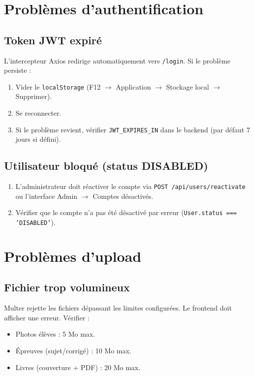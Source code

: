 \documentclass[12pt,a4paper]{report}
\begin{document}
\section{Problèmes d'authentification}

\subsection{Token JWT expiré}
L'intercepteur Axios redirige automatiquement vers \texttt{/login}. Si le problème persiste :
\begin{enumerate}
    \item Vider le \texttt{localStorage} (F12 $\rightarrow$ Application $\rightarrow$ Stockage local $\rightarrow$ Supprimer).
    \item Se reconnecter.
    \item Si le problème revient, vérifier \texttt{JWT\_EXPIRES\_IN} dans le backend (par défaut 7 jours si défini).
\end{enumerate}

\subsection{Utilisateur bloqué (status DISABLED)}
\begin{enumerate}
    \item L'administrateur doit réactiver le compte via \texttt{POST /api/users/reactivate} ou l'interface Admin $\rightarrow$ Comptes désactivés.
    \item Vérifier que le compte n'a pas été désactivé par erreur (\texttt{User.status === 'DISABLED'}).
\end{enumerate}

\section{Problèmes d'upload}

\subsection{Fichier trop volumineux}
Multer rejette les fichiers dépassant les limites configurées. Le frontend doit afficher une erreur. Vérifier :
\begin{itemize}
    \item Photos élèves : 5 Mo max.
    \item Épreuves (sujet/corrigé) : 10 Mo max.
    \item Livres (couverture + PDF) : 20 Mo max.
\end{itemize}
\end{document}
